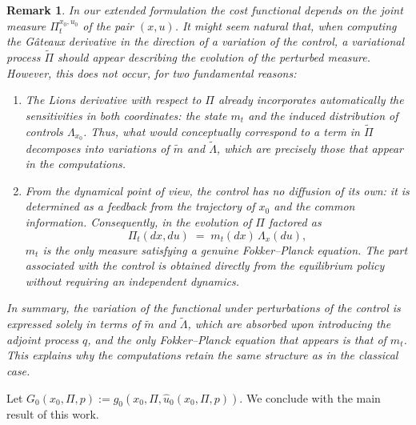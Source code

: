 \documentclass[12pt]{article}
\newtheorem*{obs*}{Remark}
\theoremstyle{definition}
\begin{document}
\begin{obs*}
In our extended formulation the cost functional depends on the joint measure
\(\Pi^{x_0,u_0}_t\) of the pair \((x,u)\). It might seem natural that, when computing the G\^{a}teaux derivative in the direction of a variation of the control, a variational process \(\tilde{\Pi}\) should appear describing the evolution of the perturbed measure. However, this does not occur, for two fundamental reasons:

\begin{enumerate}
    \item The Lions derivative with respect to \(\Pi\) already incorporates automatically the sensitivities in both coordinates: the state \(m_t\) and the induced distribution of controls \(\Lambda_{x_0}\). Thus, what would conceptually correspond to a term in \(\tilde{\Pi}\) decomposes into variations of \(\tilde{m}\) and \(\tilde{\Lambda}\), which are precisely those that appear in the computations.

    \item From the dynamical point of view, the control has no diffusion of its own: it is determined as a feedback from the trajectory of \(x_0\) and the common information. Consequently, in the evolution of \(\Pi\) factored as
    \[
        \Pi_t(dx,du) \;=\; m_t(dx)\,\Lambda_{x}(du),
    \]
    \(m_t\) is the only measure satisfying a genuine Fokker--Planck equation. The part associated with the control is obtained directly from the equilibrium policy without requiring an independent dynamics.
\end{enumerate}

In summary, the variation of the functional under perturbations of the control is expressed solely in terms of \(\tilde{m}\) and \(\tilde{\Lambda}\), which are absorbed upon introducing the adjoint process $q$, and the only Fokker--Planck equation that appears is that of \(m_t\). This explains why the computations retain the same structure as in the classical case.
\end{obs*}

Let $G_0(x_0,\Pi,p):= g_0(x_0,\Pi,\hat{u}_0(x_0,\Pi,p))$. We conclude with the main result of this work.
\end{document}

